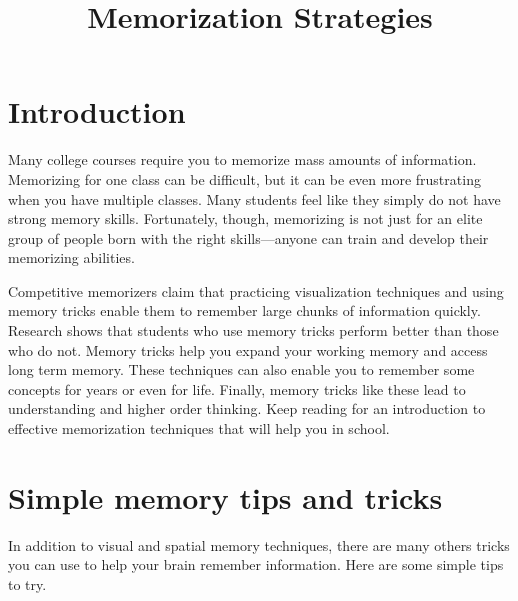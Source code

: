 \documentclass[../main.tex]{subfiles}
\title{Memorization Strategies}
\begin{document}
\maketitle
%
\section{Introduction}
Many college courses require you to memorize mass amounts of information.
Memorizing for one class can be difficult, but it can be even more frustrating
when you have multiple classes. Many students feel like they simply do not have
strong memory skills. Fortunately, though, memorizing is not just for an elite
group of people born with the right skills---anyone can train and develop their
memorizing abilities.

Competitive memorizers claim that practicing visualization techniques and using
memory tricks enable them to remember large chunks of information quickly.
Research shows that students who use memory tricks perform better than those who
do not. Memory tricks help you expand your working memory and access long term
memory. These techniques can also enable you to remember some concepts for years
or even for life. Finally, memory tricks like these lead to understanding and
higher order thinking. Keep reading for an introduction to effective
memorization techniques that will help you in school.
%
\section{Simple memory tips and tricks}
In addition to visual and spatial memory techniques, there are many others
tricks you can use to help your brain remember information. Here are some simple
tips to try.
\\
\end{document}
